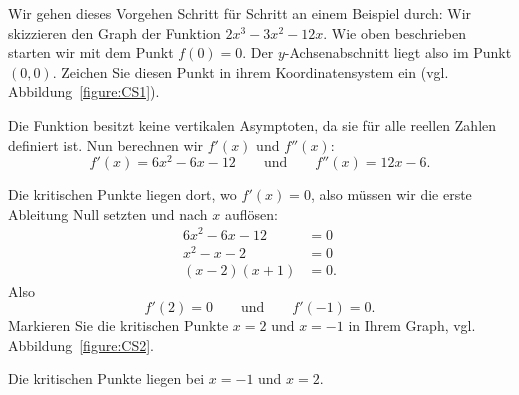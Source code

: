 Wir gehen dieses Vorgehen Schritt für Schritt an einem Beispiel durch: Wir skizzieren den Graph der Funktion
$2x^3-3x^2-12x$. Wie oben beschrieben starten wir mit dem Punkt $f(0) = 0$. Der $y$-Achsenabschnitt liegt also im Punkt $(0,0)$. Zeichen Sie diesen Punkt in ihrem Koordinatensystem ein (vgl. Abbildung~\ref{figure:CS1}).

Die Funktion besitzt keine vertikalen Asymptoten, da sie für alle reellen Zahlen definiert ist. Nun berechnen wir $f'(x)$ und $f''(x)$:
\[
f'(x) = 6x^2 -6x -12\qquad\text{und}\qquad f''(x) = 12x-6.
\]

Die kritischen Punkte liegen dort, wo $f'(x) = 0$, also müssen wir die erste Ableitung Null setzten und nach $x$ auflösen:
\begin{align*}
6x^2 -6x -12 &= 0 \\
x^2 - x -2 &=0\\
(x-2)(x+1) &=0.
\end{align*}
Also
\[
f'(2) = 0\qquad\text{und}\qquad f'(-1) = 0.
\]
Markieren Sie die kritischen Punkte $x=2$ und $x=-1$ in Ihrem Graph, vgl. Abbildung~\ref{figure:CS2}.
\begin{marginfigure}[-4in]
\caption{Die kritischen Punkte liegen bei $x=-1$ und $x=2$.}
\label{figure:CS2}
\end{marginfigure}

